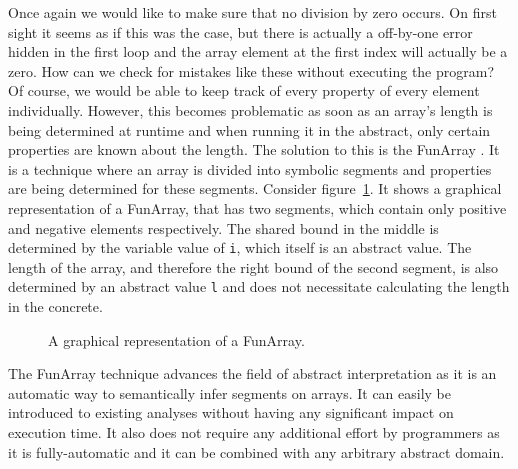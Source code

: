 \noindent Once again we would like to make sure that no division by zero occurs. On first sight it seems as if this was the case, but there is actually a off-by-one error hidden in the first loop and the array element at the first index will actually be a zero.
How can we check for mistakes like these without executing the program? Of course, we would be able to keep track of every property of every element individually. However, this becomes problematic as soon as an array's length is being determined at runtime and when running it in the abstract, only certain properties are known about the length. The solution to this is the FunArray \cite{cousot2011}. It is a technique where an array is divided into symbolic segments and properties are being determined for these segments. Consider figure~\ref{fig:funarray}. It shows a graphical representation of a FunArray, that has two segments, which contain only positive and negative elements respectively. The shared bound in the middle is determined by the variable value of \texttt{i}, which itself is an abstract value. The length of the array, and therefore the right bound of the second segment, is also determined by an abstract value \texttt{l} and does not necessitate calculating the length in the concrete.

\begin{figure}[!htb]
\vspace{0.2cm}
\begin{center}
\end{center}
\caption{A graphical representation of a FunArray.} \label{fig:funarray}

\end{figure}

\noindent The FunArray technique advances the field of abstract interpretation as it is an automatic way to semantically infer segments on arrays. It can easily be introduced to existing analyses without having any significant impact on execution time. It also does not require any additional effort by programmers as it is fully-automatic and it can be combined with any arbitrary abstract domain. 


